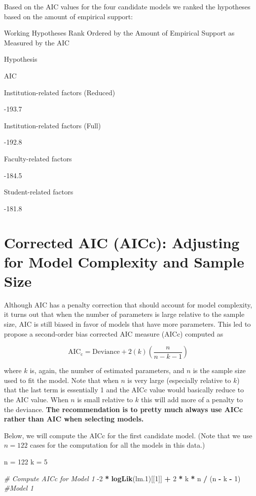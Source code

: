 \documentclass[]{book}
\newenvironment{Shaded}{\begin{snugshade}}{\end{snugshade}}
\newcommand{\CommentTok}[1]{\textcolor[rgb]{0.56,0.35,0.01}{\textit{#1}}}
\newcommand{\DecValTok}[1]{\textcolor[rgb]{0.00,0.00,0.81}{#1}}
\newcommand{\FloatTok}[1]{\textcolor[rgb]{0.00,0.00,0.81}{#1}}
\newcommand{\KeywordTok}[1]{\textcolor[rgb]{0.13,0.29,0.53}{\textbf{#1}}}
\newcommand{\NormalTok}[1]{#1}
\newcommand{\OperatorTok}[1]{\textcolor[rgb]{0.81,0.36,0.00}{\textbf{#1}}}
\newcommand{\StringTok}[1]{\textcolor[rgb]{0.31,0.60,0.02}{#1}}
\begin{document}
Based on the AIC values for the four candidate models we ranked the hypotheses based on the amount of empirical support:

\label{tab:unnamed-chunk-179}Working Hypotheses Rank Ordered by the Amount of Empirical Support as Measured by the AIC

Hypothesis

AIC

Institution-related factors (Reduced)

-193.7

Institution-related factors (Full)

-192.8

Faculty-related factors

-184.5

Student-related factors

-181.8

\hypertarget{corrected-aic-aicc-adjusting-for-model-complexity-and-sample-size}{%
\section{Corrected AIC (AICc): Adjusting for Model Complexity and Sample Size}\label{corrected-aic-aicc-adjusting-for-model-complexity-and-sample-size}}

Although AIC has a penalty correction that should account for model complexity, it turns out that when the number of parameters is large relative to the sample size, AIC is still biased in favor of models that have more parameters. This led \citet{Hurvich:1989} to propose a second-order bias corrected AIC measure (AICc) computed as

\[
\mathrm{AIC_c} = \mathrm{Deviance} + 2(k)\left( \frac{n}{n - k - 1} \right)
\]

where \(k\) is, again, the number of estimated parameters, and \(n\) is the sample size used to fit the model. Note that when \(n\) is very large (especially relative to \(k\)) that the last term is essentially 1 and the AICc value would basically reduce to the AIC value. When \(n\) is small relative to \(k\) this will add more of a penalty to the deviance. \textbf{The recommendation is to pretty much always use AICc rather than AIC when selecting models.}

Below, we will compute the AICc for the first candidate model. (Note that we use \(n=122\) cases for the computation for all the models in this data.)

\begin{Shaded}
\begin{Highlighting}[]
\NormalTok{n =}\StringTok{ }\DecValTok{122}
\NormalTok{k =}\StringTok{ }\DecValTok{5}

\CommentTok{# Compute AICc for Model 1}
\DecValTok{-2} \OperatorTok{*}\StringTok{ }\KeywordTok{logLik}\NormalTok{(lm}\FloatTok{.1}\NormalTok{)[[}\DecValTok{1}\NormalTok{]] }\OperatorTok{+}\StringTok{ }\DecValTok{2} \OperatorTok{*}\StringTok{ }\NormalTok{k }\OperatorTok{*}\StringTok{ }\NormalTok{n }\OperatorTok{/}\StringTok{ }\NormalTok{(n }\OperatorTok{-}\StringTok{ }\NormalTok{k }\OperatorTok{-}\StringTok{ }\DecValTok{1}\NormalTok{) }\CommentTok{#Model 1}
\end{Highlighting}
\end{Shaded}
\end{document}
